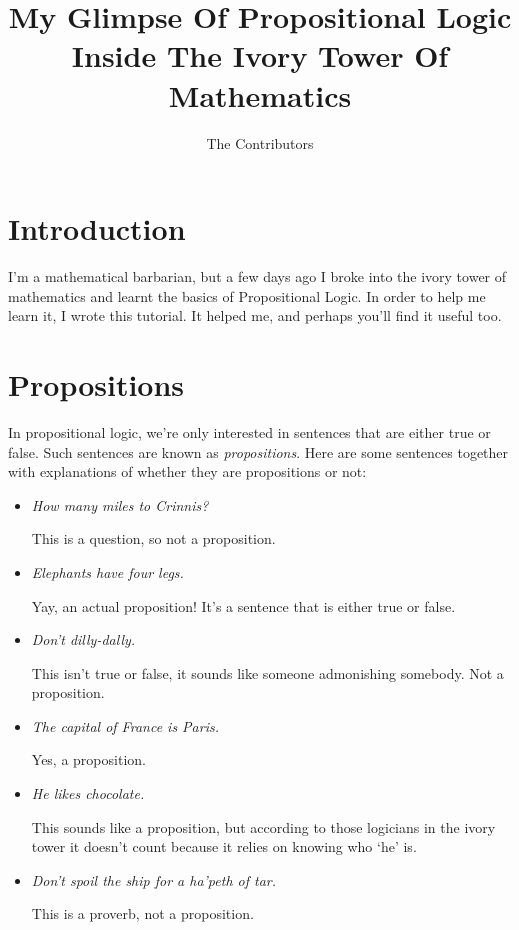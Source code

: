 \documentclass{article}
\author{The Contributors}
\title{My Glimpse Of Propositional Logic Inside The Ivory Tower Of
  Mathematics}
\begin{document}
  \maketitle
  \tableofcontents

  \section{Introduction}

  I'm a mathematical barbarian, but a few days ago I broke into the ivory tower
  of mathematics and learnt the basics of Propositional Logic. In order to help
  me learn it, I wrote this tutorial. It helped me, and perhaps you'll find it
  useful too.


  \section{\label{sec:propositions}Propositions}

    In propositional logic, we're only interested in sentences that are either
    true or false. Such sentences are known as \emph{propositions}. Here are
    some sentences together with explanations of whether they are propositions
    or not:

    \begin{itemize}

      \item \emph{How many miles to Crinnis?}

        This is a question, so not a proposition.

      \item \emph{Elephants have four legs.}

        Yay, an actual proposition! It's a sentence that is either true or
        false.

      \item \emph{Don't dilly-dally.}

        This isn't true or false, it sounds like someone admonishing somebody.
        Not a proposition.

      \item \emph{The capital of France is Paris.}

        Yes, a proposition.

      \item \emph{He likes chocolate.}

        This sounds like a proposition, but according to those logicians in
        the ivory tower it doesn't count because it relies on knowing who `he'
        is.

      \item \emph{Don't spoil the ship for a ha'peth of tar.}

        This is a proverb, not a proposition.

    \end{itemize}
\end{document}
